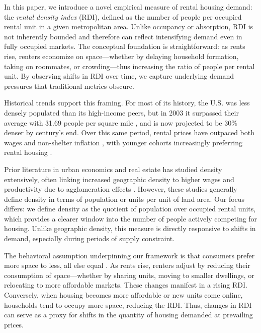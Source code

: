 \documentclass[sn-mathphys-num]{sn-jnl}%
\theoremstyle{thmstyleone}%
\theoremstyle{thmstyletwo}%
\theoremstyle{thmstylethree}%
\begin{document}
In this paper, we introduce a novel empirical measure of rental housing demand: the \textit{rental density index} (RDI), defined as the number of people per occupied rental unit in a given metropolitan area. Unlike occupancy or absorption, RDI is not inherently bounded and therefore can reflect intensifying demand even in fully occupied markets. The conceptual foundation is straightforward: as rents rise, renters economize on space---whether by delaying household formation, taking on roommates, or crowding---thus increasing the ratio of people per rental unit. By observing shifts in RDI over time, we capture underlying demand pressures that traditional metrics obscure.

Historical trends support this framing. For most of its history, the U.S. was less densely populated than its high-income peers, but in 2003 it surpassed their average with 31.69 people per square mile \citep{ourworldindataPopulationDensity}, and is now projected to be 30\% denser by century’s end. Over this same period, rental prices have outpaced both wages and non-shelter inflation \citep{feiveson2024rent, stlouisfedConsumerPrice}, with younger cohorts increasingly preferring rental housing \citep{fanniemaeConsumersFeeling}.

Prior literature in urban economics and real estate has studied density extensively, often linking increased geographic density to higher wages and productivity due to agglomeration effects \citep{titman2024city, liu2018vertical}. However, these studies generally define density in terms of population or units per unit of land area. Our focus differs: we define density as the quotient of population over occupied rental units, which provides a clearer window into the number of people actively competing for housing. Unlike geographic density, this measure is directly responsive to shifts in demand, especially during periods of supply constraint.

The behavioral assumption underpinning our framework is that consumers prefer more space to less, all else equal \citep{molloy2022housing, muth1969cities}. As rents rise, renters adjust by reducing their consumption of space---whether by sharing units, moving to smaller dwellings, or relocating to more affordable markets. These changes manifest in a rising RDI. Conversely, when housing becomes more affordable or new units come online, households tend to occupy more space, reducing the RDI. Thus, changes in RDI can serve as a proxy for shifts in the quantity of housing demanded at prevailing prices.
\end{document}
